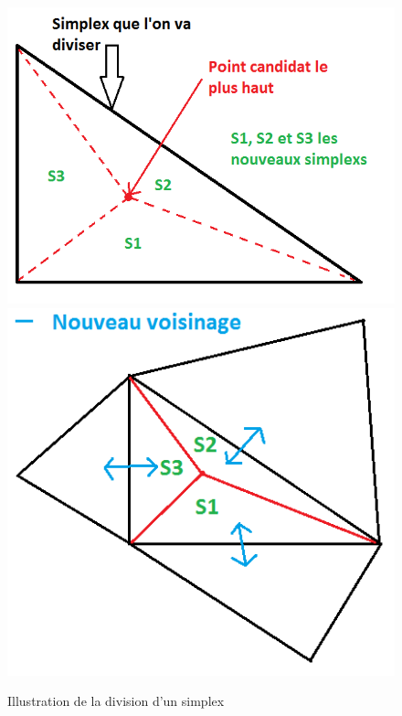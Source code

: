 \documentclass[10pt,a4paper]{report}
\begin{document}
\begin{figure}[!htbp]
	\begin{center}
  		\includegraphics[scale=0.5]{Division3Simplex.png}
  		\includegraphics[scale=0.5]{Division3SimplexVoisin.png} 
  	\end{center}
   	\caption{Illustration de la division d'un simplex}
	\label{Illustration de la division d'un simplex}
\end{figure}
\end{document}
